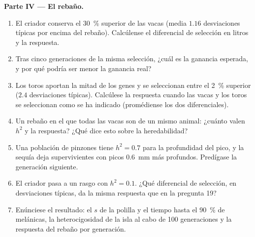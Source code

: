 \begin{problem}
\medskip
\noindent\textbf{Parte IV --- El rebaño.}
\begin{enumerate}[resume]
  \item El criador conserva el \qty{30}{\%} superior de las vacas (media
        $1.16$ desviaciones típicas por encima del rebaño). Calcúlense el
        diferencial de selección en litros y la respuesta.
  \item Tras cinco generaciones de la misma selección, ¿cuál es la
        ganancia esperada, y por qué podría ser menor la ganancia real?
  \item Los toros aportan la mitad de los genes y se seleccionan entre el
        \qty{2}{\%} superior ($2.4$ desviaciones típicas). Calcúlese la
        respuesta cuando las vacas y los toros se seleccionan como se ha
        indicado (promédiense los dos diferenciales).
  \item Un rebaño en el que todas las vacas son  de un mismo animal:
        ¿cuánto valen $h^{2}$ y la respuesta? ¿Qué dice esto sobre la
        heredabilidad?
  \item Una población de pinzones tiene $h^{2} = 0.7$ para la profundidad
        del pico, y la sequía deja supervivientes con picos \qty{0.6}{mm}
        más profundos. Predígase la generación siguiente.
  \item El criador pasa a un rasgo con $h^{2} = 0.1$. ¿Qué diferencial de
        selección, en desviaciones típicas, da la misma respuesta que en la
        pregunta 19?
  \item Enúnciese el resultado: el $s$ de la polilla y el tiempo hasta el
        \qty{90}{\%} de melánicas, la heterocigosidad de la isla al cabo de
        100 generaciones y la respuesta del rebaño por generación.
\end{enumerate}
\end{problem}
